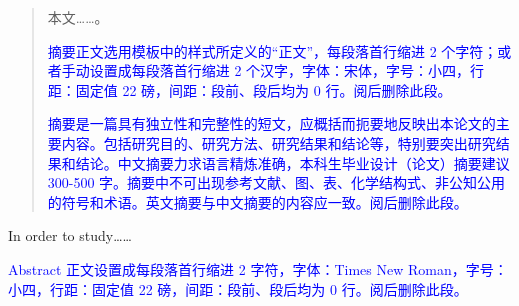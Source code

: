 
\begin{abstract}
本文……。

\textcolor{blue}{摘要正文选用模板中的样式所定义的“正文”，每段落首行缩进 2 个字符；或者手动设置成每段落首行缩进 2 个汉字，字体：宋体，字号：小四，行距：固定值 22 磅，间距：段前、段后均为 0 行。阅后删除此段。}

\textcolor{blue}{摘要是一篇具有独立性和完整性的短文，应概括而扼要地反映出本论文的主要内容。包括研究目的、研究方法、研究结果和结论等，特别要突出研究结果和结论。中文摘要力求语言精炼准确，本科生毕业设计（论文）摘要建议 300-500 字。摘要中不可出现参考文献、图、表、化学结构式、非公知公用的符号和术语。英文摘要与中文摘要的内容应一致。阅后删除此段。}

\end{abstract}


\begin{abstractEn}
In order to study……

\textcolor{blue}{Abstract 正文设置成每段落首行缩进 2 字符，字体：Times New Roman，字号：小四，行距：固定值 22 磅，间距：段前、段后均为 0 行。阅后删除此段。}
\end{abstractEn}
